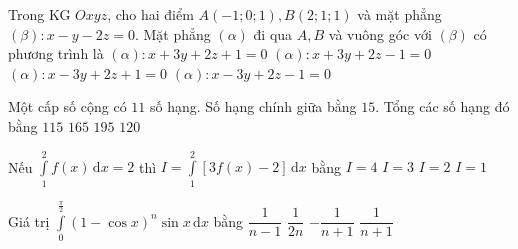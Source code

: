 \begin{ex}%
	Trong KG $Oxyz$, cho hai điểm $A(-1; 0; 1), B(2; 1; 1)$ và mặt phẳng \break $(\beta)\colon x-y-2z=0$. Mặt phẳng $(\alpha)$ đi qua $A, B$ và vuông góc với $(\beta)$ có phương trình là
	\choice
	{$(\alpha)\colon x+3y+2z+1=0$}
	{$(\alpha)\colon x+3y+2z-1=0$}
	{$(\alpha)\colon x-3y+2z+1=0$}
	{\True $(\alpha)\colon x-3y+2z-1=0$}
\end{ex}

\begin{ex}%
	Một cấp số cộng có $11$ số hạng. Số hạng chính giữa bằng $15$. Tổng các số hạng đó bằng
	\choice
	{$115$}
	{\True $165$}
	{$195$}
	{$120$}
\end{ex}

\begin{ex}%
	Nếu $\displaystyle\int\limits_1^2 f(x) \mathrm{\,d}x=2$ thì $I=\displaystyle\int\limits_1^2[3 f(x)-2] \mathrm{\,d}x$ bằng
	\choice
	{\True $I=4$}
	{$I=3$}
	{$I=2$}
	{$I=1$}
\end{ex}
\begin{ex}%
	Giá trị $\displaystyle\int\limits_0^{\frac{\pi}{2}}(1-\cos x)^n \sin x \mathrm{\,d}x$ bằng
	\choice
	{$\dfrac{1}{n-1}$}
	{$\dfrac{1}{2 n}$}
	{$-\dfrac{1}{n+1}$}
	{\True $\dfrac{1}{n+1}$}
\end{ex}

